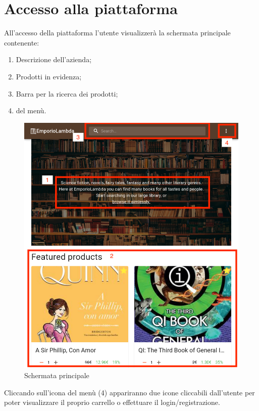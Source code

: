 \section{Accesso alla piattaforma}\label{Accesso}
All'accesso della piattaforma l'utente visualizzerà la schermata principale contenente:
\begin{enumerate}
	\item Descrizione dell'azienda;
	\item Prodotti in evidenza;
	\item Barra per la ricerca dei prodotti;
	\item {} del menù. 
\end{enumerate} 
\begin{figure}[H]
	\centering
	\includegraphics[scale=0.4]{Immagini/Acquirente/home_primo_accesso.png}
	\caption{Schermata principale}
	\label{fig:Home}
\end{figure}
Cliccando sull'icona del menù (4) appariranno due icone cliccabili dall'utente per poter visualizzare il proprio carrello o effettuare il login/registrazione.
